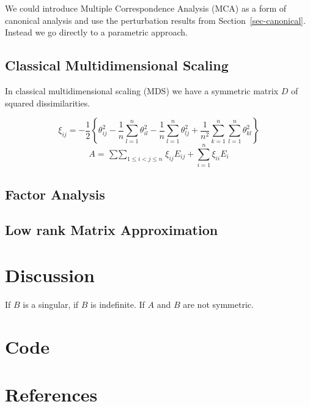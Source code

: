 \documentclass[
  12pt,
  letterpaper,
  DIV=11,
  numbers=noendperiod]{scrartcl}
\begin{document}
We could introduce Multiple Correspondence Analysis (MCA) as a form of
canonical analysis and use the perturbation results from
Section~\ref{sec-canonical}. Instead we go directly to a parametric
approach.

\subsection{Classical Multidimensional
Scaling}\label{classical-multidimensional-scaling}

In classical multidimensional scaling (MDS) we have a symmetric matrix
\(D\) of squared dissimilarities.

\[
\xi_{ij}=-\frac12\left\{\theta_{ij}^2-\frac{1}{n}\sum_{l=1}^n\theta_{il}^2-\frac{1}{n}\sum_{l=1}^n\theta_{lj}^2
+\frac{1}{n^2}\sum_{k=1}^n\sum_{l=1}^n\theta_{kl}^2\right\}
\] \[
A=\mathop{\sum\sum}_{1\leq i<j\leq n}\xi_{ij}E_{ij}+\sum_{i=1}^n\xi_{ii}E_i
\]

\subsection{Factor Analysis}\label{sec-fa}

\subsection{Low rank Matrix Approximation}\label{sec-rank}

\section{Discussion}\label{sec-discussion}

If \(B\) is a singular, if \(B\) is indefinite. If \(A\) and \(B\) are
not symmetric.

\section{Code}\label{sec-code}

\section*{References}\label{sec-references}
\end{document}
